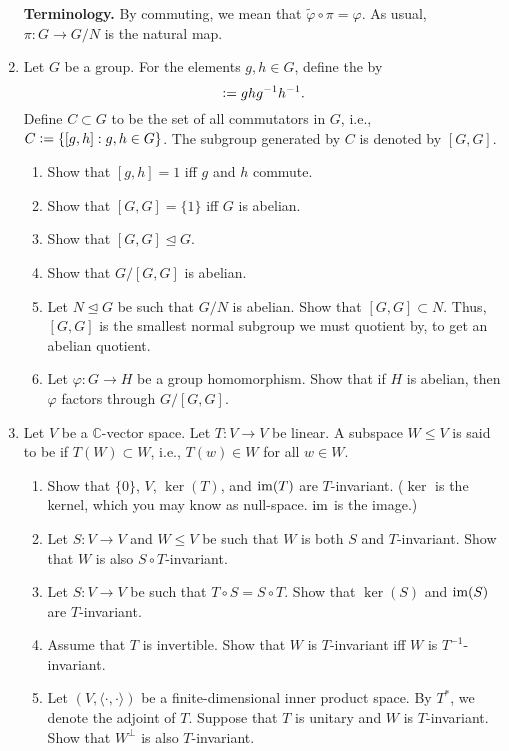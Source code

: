 \documentclass[12pt]{article}
\begin{document}
\begin{enumerate}
	\textbf{Terminology.} By  commuting, we mean that $\widetilde{\varphi} \circ \pi = \varphi$. As usual, $\pi : G \to G/N$ is the natural map.
	\item Let $G$ be a group. For the elements $g, h \in G$, define the  by
	\begin{equation*} 
		[g, h] \vcentcolon= ghg^{-1}h^{-1}.
	\end{equation*} 
	Define $C \subset G$ to be the set of all commutators in $G$, i.e., $C \vcentcolon= \{[g, h] : g, h \in G\}$. The subgroup generated by $C$ is denoted by $[G, G]$. 
	\begin{enumerate}
		\item Show that $[g, h] = 1$ iff $g$ and $h$ commute. 
		\item Show that $[G, G] = \{1\}$ iff $G$ is abelian.
		\item Show that $[G, G] \unlhd G$.
		\item Show that $G/[G, G]$ is abelian.
		\item Let $N \unlhd G$ be such that $G/N$ is abelian. Show that $[G, G] \subset N$. Thus, $[G, G]$ is the smallest normal subgroup we must quotient by, to get an abelian quotient.
		\item Let $\varphi : G \to H$ be a group homomorphism. Show that if $H$ is abelian, then $\varphi$ factors through $G/[G, G]$.
	\end{enumerate}
	\item Let $V$ be a $\mathbb{C}$-vector space. Let $T : V \to V$ be linear. A subspace $W \le V$ is said to be  if $T(W) \subset W$, i.e., $T(w) \in W$ for all $w \in W$.
	\begin{enumerate}
		\item Show that $\{0\}$, $V$, $\ker(T)$, and $\operatorname{im}(T)$ are $T$-invariant. ($\ker$ is the kernel, which you may know as null-space. $\operatorname{im}$ is the image.)
		\item Let $S : V \to V$ and $W \le V$ be such that $W$ is both $S$ and $T$-invariant. Show that $W$ is also $S \circ T$-invariant.
		\item Let $S : V \to V$ be such that $T \circ S = S \circ T$. {\color{red}Show that $\ker(S)$ and $\operatorname{im}(S)$ are $T$-invariant.} %
		\item Assume that $T$ is invertible. Show that $W$ is $T$-invariant iff $W$ is $T^{-1}$-invariant.
		\item Let $(V, \langle \cdot, \cdot\rangle)$ be a finite-dimensional inner product space. By $T^{\ast}$, we denote the adjoint of $T$. Suppose that $T$ is unitary and $W$ is $T$-invariant. Show that $W^{\perp}$ is also $T$-invariant.

\end{enumerate}
\end{enumerate}
\end{document}
